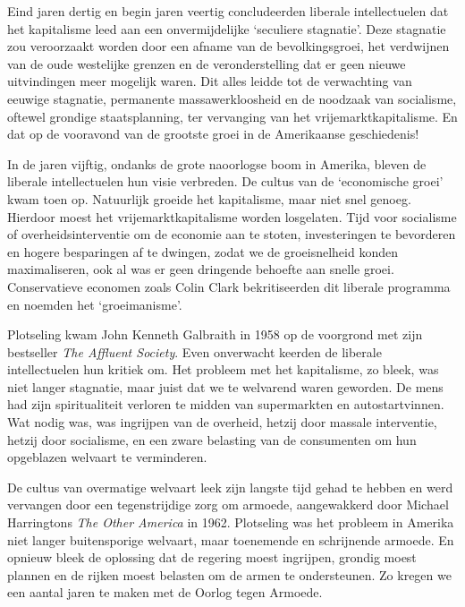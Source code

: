 \documentclass[
  a5paper,
  smalldemyvopaper,10pt,twoside,onecolumn,openright,extrafontsizes,hidelinks]{memoir}
\begin{document}
Eind jaren dertig en begin jaren veertig concludeerden liberale
intellectuelen dat het kapitalisme leed aan een onvermijdelijke
`seculiere stagnatie'. Deze stagnatie zou veroorzaakt worden door een
afname van de bevolkingsgroei, het verdwijnen van de oude westelijke
grenzen en de veronderstelling dat er geen nieuwe uitvindingen meer
mogelijk waren. Dit alles leidde tot de verwachting van eeuwige
stagnatie, permanente massawerkloosheid en de noodzaak van socialisme,
oftewel grondige staatsplanning, ter vervanging van het
vrijemarktkapitalisme. En dat op de vooravond van de grootste groei in
de Amerikaanse geschiedenis!

In de jaren vijftig, ondanks de grote naoorlogse boom in Amerika, bleven
de liberale intellectuelen hun visie verbreden. De cultus van de
`economische groei' kwam toen op. Natuurlijk groeide het kapitalisme,
maar niet snel genoeg. Hierdoor moest het vrijemarktkapitalisme worden
losgelaten. Tijd voor socialisme of overheidsinterventie om de economie
aan te stoten, investeringen te bevorderen en hogere besparingen af te
dwingen, zodat we de groeisnelheid konden maximaliseren, ook al was er
geen dringende behoefte aan snelle groei. Conservatieve economen zoals
Colin Clark bekritiseerden dit liberale programma en noemden het
`groeimanisme'.

Plotseling kwam John Kenneth Galbraith in 1958 op de voorgrond met zijn
bestseller \emph{The Affluent Society}. Even onverwacht keerden de
liberale intellectuelen hun kritiek om. Het probleem met het
kapitalisme, zo bleek, was niet langer stagnatie, maar juist dat we te
welvarend waren geworden. De mens had zijn spiritualiteit verloren te
midden van supermarkten en autostartvinnen. Wat nodig was, was ingrijpen
van de overheid, hetzij door massale interventie, hetzij door
socialisme, en een zware belasting van de consumenten om hun opgeblazen
welvaart te verminderen.

De cultus van overmatige welvaart leek zijn langste tijd gehad te hebben
en werd vervangen door een tegenstrijdige zorg om armoede, aangewakkerd
door Michael Harringtons \emph{The Other America} in 1962. Plotseling
was het probleem in Amerika niet langer buitensporige welvaart, maar
toenemende en schrijnende armoede. En opnieuw bleek de oplossing dat de
regering moest ingrijpen, grondig moest plannen en de rijken moest
belasten om de armen te ondersteunen. Zo kregen we een aantal jaren te
maken met de Oorlog tegen Armoede.
\end{document}

